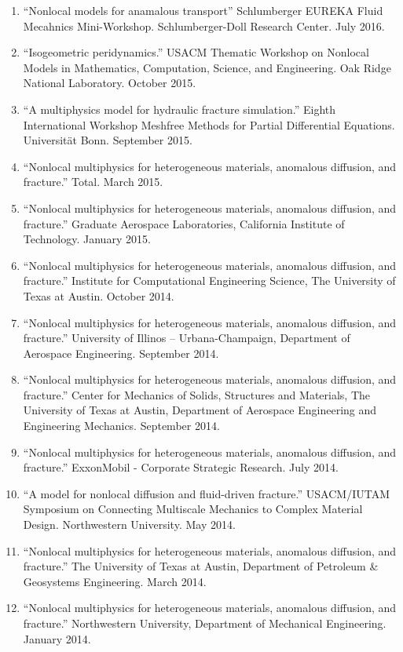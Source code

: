 \begin{etaremune}
\begin{enumerate}
    \item ``Nonlocal models for anamalous transport'' Schlumberger EUREKA Fluid Mecahnics Mini-Workshop. Schlumberger-Doll Research Center. July 2016.
    \item ``Isogeometric peridynamics.'' USACM Thematic Workshop on Nonlocal Models in Mathematics, Computation, Science, and Engineering.  Oak Ridge National Laboratory. October 2015.
    \item ``A multiphysics model for hydraulic fracture simulation.''  Eighth International Workshop Meshfree Methods for Partial Differential Equations. Universit\"{a}t Bonn. September 2015.
    \item ``Nonlocal multiphysics for heterogeneous materials, anomalous diffusion, and fracture.'' Total. March 2015.
    \item ``Nonlocal multiphysics for heterogeneous materials, anomalous diffusion, and fracture.'' Graduate Aerospace Laboratories, California Institute of Technology. January 2015.
    \item ``Nonlocal multiphysics for heterogeneous materials, anomalous diffusion, and fracture.'' Institute for Computational Engineering Science, The University of Texas at Austin. October 2014.
    \item ``Nonlocal multiphysics for heterogeneous materials, anomalous diffusion, and fracture.'' University of Illinos -- Urbana-Champaign, Department of Aerospace Engineering. September 2014.
    \item ``Nonlocal multiphysics for heterogeneous materials, anomalous diffusion, and fracture.'' Center for Mechanics of Solids, Structures and Materials, The University of Texas at Austin, Department of Aerospace Engineering and Engineering Mechanics. September 2014.
    \item ``Nonlocal multiphysics for heterogeneous materials, anomalous diffusion, and fracture.'' ExxonMobil - Corporate Strategic Research. July 2014.
    \item ``A model for nonlocal diffusion and fluid-driven fracture.'' USACM/IUTAM Symposium on Connecting Multiscale Mechanics to Complex Material Design. Northwestern University. May 2014.
    \item ``Nonlocal multiphysics for heterogeneous materials, anomalous diffusion, and fracture.'' The University of Texas at Austin, Department of Petroleum \& Geosystems Engineering. March 2014.
    \item ``Nonlocal multiphysics for heterogeneous materials, anomalous diffusion, and fracture.'' Northwestern University, Department of Mechanical Engineering. January 2014.

\end{enumerate}
\end{etaremune}
